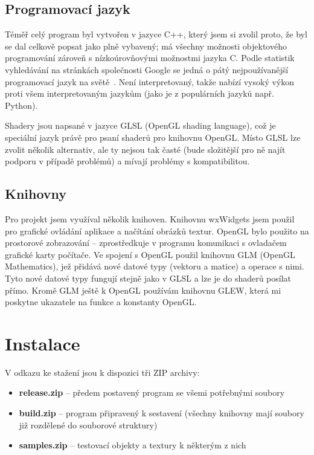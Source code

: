 \documentclass[a4paper, 11pt]{report}
\begin{document}
\section{Programovací jazyk}
Téměř celý program byl vytvořen v jazyce C++, který jsem si zvolil proto, že byl se dal celkově popsat jako plně vybavený; má všechny možnosti objektového programování zároveň s nízkoúrovňovými možnostmi jazyka C. Podle statistik vyhledávání na stránkách společnosti Google se jedná o pátý nejpoužívanější programovací jazyk na světě~\cite{github:pypl}. Není interpretovaný, takže nabízí vysoký výkon proti všem interpretovaným jazykům (jako je z populárních jazyků např. Python).

Shadery jsou napsané v jazyce GLSL (OpenGL shading language), což je speciální jazyk právě pro psaní shaderů pro knihovnu OpenGL. Místo GLSL lze zvolit několik alternativ, ale ty nejsou tak časté (bude složitější pro ně najít podporu v případě problémů) a mívají problémy s kompatibilitou.

\section{Knihovny}
Pro projekt jsem využíval několik knihoven. Knihovnu wxWidgets jsem použil pro grafické ovládání aplikace a načítání obrázků textur. OpenGL bylo použito na prostorové zobrazování -- zprostředkuje v programu komunikaci s ovladačem grafické karty počítače. Ve spojení s OpenGL použil knihovnu GLM (OpenGL Mathematics), jež přidává nové datové typy (vektoru a matice) a operace s nimi. Tyto nové datové typy fungují stejně jako v GLSL a lze je do shaderů posílat přímo. Kromě GLM ještě k OpenGL používám knihovnu GLEW, která mi poskytne ukazatele na funkce a konstanty OpenGL.

\chapter{Instalace}
V odkazu ke stažení jsou k dispozici tři ZIP archivy:
\begin{itemize}
    \item \textbf{release.zip} -- předem postavený program se všemi potřebnými soubory
    \item \textbf{build.zip} -- program připravený k sestavení (všechny knihovny mají soubory již rozdělené do souborové struktury)
    \item \textbf{samples.zip} -- testovací objekty a textury k některým z nich
\end{itemize}
\end{document}
